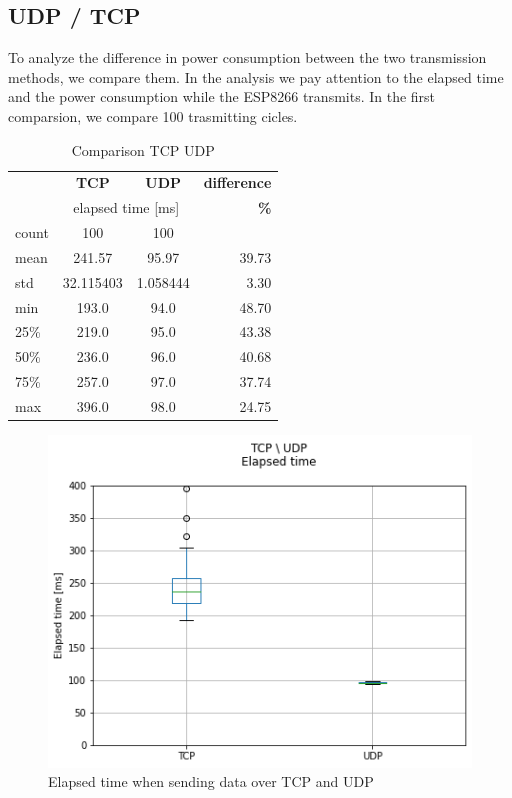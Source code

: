 \subsection{UDP / TCP}
To analyze the difference in power consumption between the two transmission methods,
we compare them. In the analysis we pay attention to the elapsed time and the power consumption while the
ESP8266 transmits. In the first comparsion, we compare 100 trasmitting cicles.
\linebreak
\begin{table}[H]
    \begin{center}
    \caption{Comparison TCP UDP}
    \label{tab:table3}
    \renewcommand{\arraystretch}{1.8}
    \begin{tabular}{l|c|c|r}
    & \textbf{TCP} & \textbf{UDP} & \textbf{difference} \\
    & \multicolumn{2}{c|}{elapsed time [ms]} & \textbf{\%}\\
    \hline
    count & 100 & 100 & \\
    mean  & 241.57 & 95.97 & 39.73 \\
    std   & 32.115403 & 1.058444 & 3.30 \\
    min   & 193.0 & 94.0 & 48.70 \\
    25\%  & 219.0 & 95.0 & 43.38 \\
    50\%  & 236.0 & 96.0 & 40.68 \\
    75\%  & 257.0 & 97.0 & 37.74 \\
    max   & 396.0 & 98.0 & 24.75 \\
    \end{tabular}
    \end{center}
\end{table}
\begin{figure}[H]
    \centering
    \includegraphics[width = 0.9 \linewidth]{fig/udp_tcp/udp_tcp_boxplot_time.png}
    \caption{Elapsed time when sending data over TCP and UDP}
    \label{fig:udp_tcp_boxplot_time}
    \end{figure}
